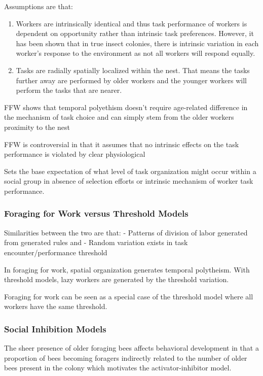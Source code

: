 Assumptions are that:
\begin{enumerate}
	\item Workers are intrinsically identical and thus task performance of workers is dependent on opportunity rather than intrinsic task preferences.  However, it has been shown that in true insect colonies, there is intrinsic variation in each worker's response to the environment as not all workers will respond equally. 
	\item Tasks are radially spatially localized within the nest. That means the tasks further away are performed by older workers and the younger workers will perform the tasks that are nearer.
\end{enumerate}

FFW shows that temporal polyethism doesn't require age-related difference in the mechanism of task choice and can simply stem from the older workers proximity to the nest

FFW is controversial in that it assumes that no intrinsic effects on the task performance is violated by clear physiological 

Sets the base expectation of what level of task organization might occur within a social group in absence of selection efforts or intrinsic mechanism of worker task performance.

\subsubsection{Foraging for Work versus Threshold Models} %
Similarities between the two are that:
- Patterns of division of labor generated from generated rules and 
- Random variation exists in task encounter/performance threshold

In foraging for work, spatial organization generates temporal polytheism. 
With threshold models, lazy workers are generated by the threshold variation. 

Foraging for work can be seen as a special case of the threshold model where all workers have the same threshold. %

\subsubsection{Social Inhibition Models}

The sheer presence of older foraging bees affects behavioral development in that a proportion of bees becoming foragers indirectly related to the number of older bees present in the colony  which motivates the activator-inhibitor model.


